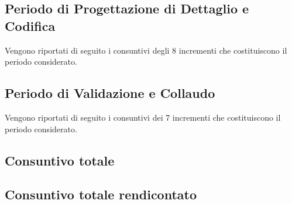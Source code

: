 \subsection{Periodo di Progettazione di Dettaglio e Codifica}
Vengono riportati di seguito i consuntivi degli 8 incrementi che costituiscono il periodo considerato.











\subsection{Periodo di Validazione e Collaudo}
Vengono riportati di seguito i consuntivi dei 7 incrementi che costituiscono il periodo considerato.










\subsection{Consuntivo totale}

\subsection{Consuntivo totale rendicontato}

